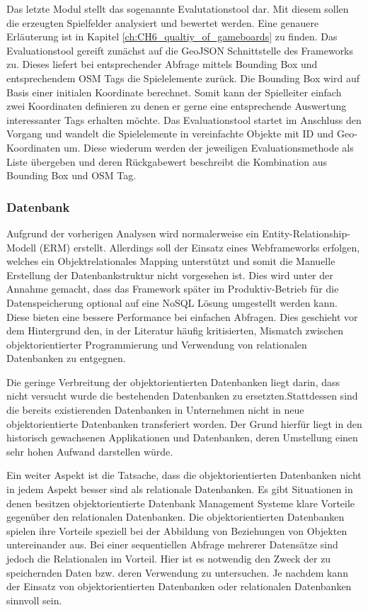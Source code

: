 Das letzte Modul stellt das sogenannte Evalutationstool dar.
Mit diesem sollen die erzeugten Spielfelder analysiert und bewertet werden. Eine genauere Erläuterung ist in Kapitel \ref{ch:CH6_qualtiy_of_gameboards} zu finden.
Das Evaluationstool gereift zunächst auf die GeoJSON Schnittstelle des Frameworks zu. Dieses liefert bei entsprechender Abfrage mittels Bounding Box und entsprechendem OSM Tags die Spielelemente zurück. Die Bounding Box wird auf Basis einer initialen Koordinate berechnet. Somit kann der Spielleiter einfach zwei Koordinaten definieren zu denen er gerne eine entsprechende Auswertung interessanter Tags erhalten möchte. Das Evaluationstool startet im Anschluss den Vorgang und wandelt die Spielelemente in vereinfachte Objekte mit ID und Geo-Koordinaten um. Diese wiederum werden der jeweiligen Evaluationsmethode als Liste übergeben und deren Rückgabewert beschreibt die Kombination aus Bounding Box und OSM Tag.

\subsubsection*{Datenbank}

Aufgrund der vorherigen Analysen wird normalerweise ein Entity-Relationship-Modell (ERM) erstellt. Allerdings soll der Einsatz eines Webframeworks erfolgen, welches ein Objektrelationales Mapping unterstützt und somit die Manuelle Erstellung der Datenbankstruktur nicht vorgesehen ist. Dies wird unter der Annahme gemacht, dass das Framework später im Produktiv-Betrieb für die Datenspeicherung optional auf eine NoSQL Lösung umgestellt werden kann. Diese bieten eine bessere Performance bei einfachen Abfragen.
Dies geschieht vor dem Hintergrund den, in der Literatur häufig kritisierten, Mismatch zwischen objektorientierter Programmierung und Verwendung von relationalen Datenbanken zu entgegnen.\cite{Cattell.1991}

Die geringe Verbreitung der objektorientierten Datenbanken liegt darin, dass nicht
versucht wurde die bestehenden Datenbanken zu ersetzten.Stattdessen sind die bereits existierenden Datenbanken in Unternehmen nicht in neue objektorientierte Datenbanken transferiert worden. Der Grund hierfür liegt in den historisch gewachsenen Applikationen und Datenbanken, deren Umstellung einen sehr hohen Aufwand darstellen würde.\cite{Burleson.1994}

Ein weiter Aspekt ist die Tatsache, dass die objektorientierten Datenbanken nicht in jedem Aspekt
besser sind als relationale Datenbanken. Es gibt Situationen in denen besitzen objektorientierte
Datenbank Management Systeme klare Vorteile gegenüber den relationalen Datenbanken.
Die objektorientierten Datenbanken spielen ihre Vorteile speziell bei der Abbildung von Beziehungen von Objekten untereinander aus. Bei einer sequentiellen Abfrage mehrerer Datensätze sind
jedoch die Relationalen im Vorteil.\cite{Van.2006} Hier ist es notwendig den Zweck der zu speichernden Daten bzw. deren Verwendung zu untersuchen. Je nachdem kann der Einsatz von objektorientierten Datenbanken oder relationalen Datenbanken sinnvoll sein.

